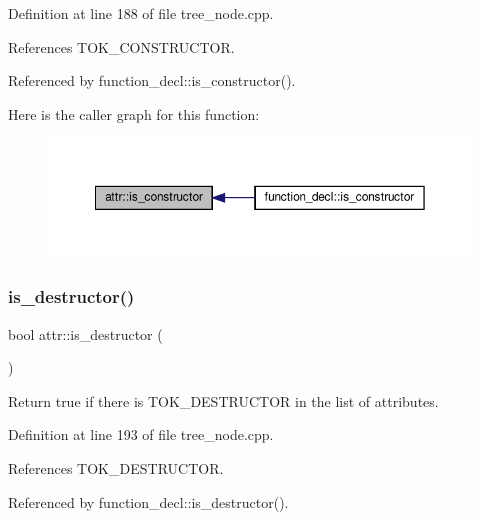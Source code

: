 Definition at line 188 of file tree\+\_\+node.\+cpp.



References T\+O\+K\+\_\+\+C\+O\+N\+S\+T\+R\+U\+C\+T\+OR.



Referenced by function\+\_\+decl\+::is\+\_\+constructor().

Here is the caller graph for this function\+:
\nopagebreak
\begin{figure}[H]
\begin{center}
\leavevmode
\includegraphics[width=350pt]{dc/de4/structattr_ac69c066beb6c45ac1e0cb44d785a652a_icgraph}
\end{center}
\end{figure}
\mbox{\label{structattr_a4dfbb6528d0735197b898f69a09ee6d2}} 
\subsubsection{\texorpdfstring{is\+\_\+destructor()}{is\_destructor()}}
{\footnotesize\ttfamily bool attr\+::is\+\_\+destructor (\begin{DoxyParamCaption}{ }\end{DoxyParamCaption})}



Return true if there is T\+O\+K\+\_\+\+D\+E\+S\+T\+R\+U\+C\+T\+OR in the list of attributes. 



Definition at line 193 of file tree\+\_\+node.\+cpp.



References T\+O\+K\+\_\+\+D\+E\+S\+T\+R\+U\+C\+T\+OR.



Referenced by function\+\_\+decl\+::is\+\_\+destructor().

